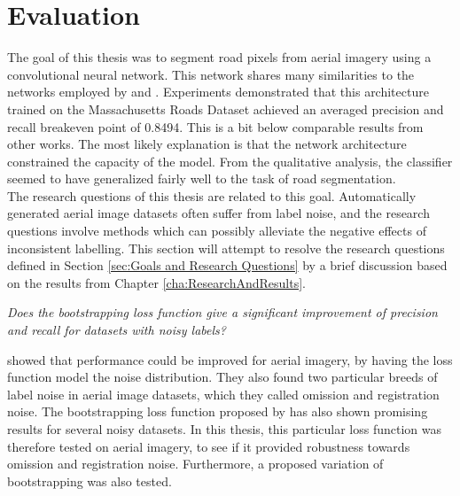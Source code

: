 \section{Evaluation}
\label{sec:SummaryDiscussion}
The goal of this thesis was to segment road pixels from aerial imagery using a convolutional neural network. This network shares many similarities to the networks employed by \cite{Mnih_aerial_images_noisy} and \citep{MnihThesis}. Experiments demonstrated that this architecture trained on the Massachusetts Roads Dataset achieved an averaged precision and recall breakeven point of 0.8494. This is a bit below comparable results from other works. The most likely explanation is that the network architecture constrained the capacity of the model. From the qualitative analysis, the classifier seemed to have generalized fairly well to the task of road segmentation.\\

 The research questions of this thesis are related to this goal. Automatically generated aerial image datasets often suffer from label noise, and the research questions involve methods which can possibly alleviate the negative effects of inconsistent labelling. This section will attempt to resolve the research questions defined in Section \ref{sec:Goals and Research Questions} by a brief discussion based on the results from Chapter \ref{cha:ResearchAndResults}.
 
\begin{description}[ style=nextline, leftmargin=1.5em, rightmargin=1.5em]
\item[Research question 1:]{\it Does the bootstrapping loss function give a significant improvement of precision and recall for datasets with noisy labels?}
\end{description}

\cite{Mnih_aerial_images_noisy} showed that performance could be improved for aerial imagery, by having the loss function model the noise distribution. They also found two particular breeds of label noise in aerial image datasets, which they called omission and registration noise. The bootstrapping loss function proposed by \cite{Reed_noisy_labels_bootstrapping} has also shown promising results for several noisy datasets. In this thesis, this particular loss function was therefore tested on aerial imagery, to see if it provided robustness towards omission and registration noise. Furthermore, a proposed variation of bootstrapping was also tested.\\

